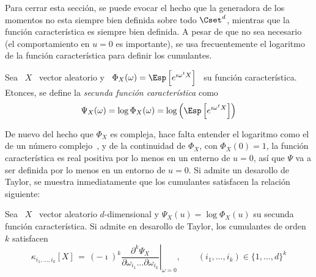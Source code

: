 {Para cerrar  esta secci\'on, se puede evocar  el hecho que la  generadora de los
momentos no  esta siempre  bien definida sobre  todo $\Cset^d$, mientras  que la
funci\'on  caracter\'istica es  siempre bien  definida. A  pesar de  que  no sea
necesario (el comportamiento  en $u=0$ es importante), se  usa frecuentemente el
logaritmo de la funci\'on caracter\'istica para definir los cumulantes.
%
\begin{definicion}
  Sea  \ $X$  \  vector aleatorio  y  \ $\Phi_X(\omega)  = \Esp\left[  e^{\imath
      \omega^t X}  \right]$ \ su funci\'on caracter\'istica.  Etonces, se define
  la {\em secunda funci\'on caracter\'istica} como
  \[
  \Psi_X(\omega)  =  \log   \Phi_X(\omega)  =  \log\left(  \Esp\left[  e^{\imath
        \omega^t X} \right] \right)
  \]
\end{definicion}
%
De nuevo  del hecho que $\Phi_X$  es compleja, hace falta  entender el logaritmo
como el de  un n\'umero complejo~\cite{Abl03, CarKro05}, y  de la continuidad de
$\Phi_X$, con  $\Phi_X(0) = 1$,  la funci\'on caracter\'istica es  real positiva
por lo menos en un enterno de $u = 0$, as\'i que $\Psi$ va a ser definida por lo
menos en  un entorno de $u  = 0$. Si admite  un desarollo de  Taylor, se muestra
inmediatamente que los cumulantes satisfacen la relaci\'on siguiente:
%
\begin{lema}\label{Lem:MP:CumSecFctCarac}
%
  Sea \ $X$ \ vector aleatorio $d$-dimensional y $\Psi_X(u) = \log \Phi_X(u)$ su
  secunda  funci\'on caracter\'istica.  Si  admite en  desarollo de  Taylor, los
  cumulantes de orden $k$ satisfacen
  \[
  \kappa_{i_1,\ldots,i_k}[X]    \,   =   \,    (-\imath)^k   \left.\frac{\partial^k
      \Psi_X}{\partial    \omega_{i_1}    \ldots   \partial    \omega_{i_k}}
  \right|_{\omega   =    0},   \qquad    (i_1 , \ldots , i_k) \in \{ 1 , \ldots , d \}^k
  \]
\end{lema}


}
